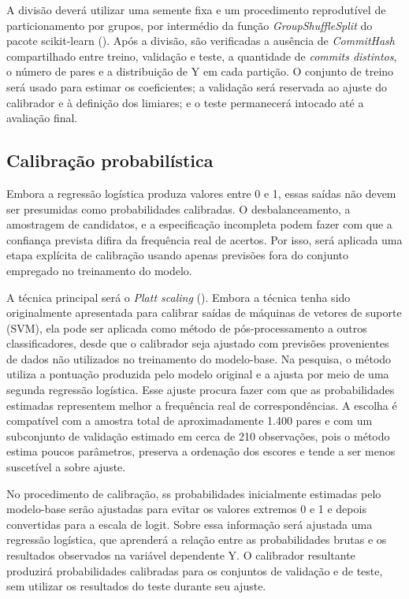 A divisão deverá utilizar uma semente fixa e um procedimento reprodutível de particionamento por grupos, por intermédio da função \textit{GroupShuffleSplit} do pacote scikit-learn (\cite{pedregosa2011scikit}). Após a divisão, são verificadas a ausência de \textit{CommitHash} compartilhado entre treino, validação e teste, a quantidade de \textit{commits distintos}, o número de pares e a distribuição de Y em cada partição. O conjunto de treino será usado para estimar os coeficientes; a validação será reservada ao ajuste do calibrador e à definição dos limiares; e o teste permanecerá intocado até a avaliação final.


\subsection{Calibração probabilística} 

Embora a regressão logística produza valores entre 0 e 1, essas saídas não devem ser presumidas como probabilidades calibradas. O desbalanceamento, a amostragem de candidatos, e a especificação incompleta podem fazer com que a confiança prevista difira da frequência real de acertos. Por isso, será aplicada uma etapa explícita de calibração usando apenas previsões fora do conjunto empregado no treinamento do modelo.

A técnica principal será o \textit{Platt scaling} (\cite{platt1999probabilistic}). Embora a técnica tenha sido originalmente apresentada para calibrar saídas de máquinas de vetores de suporte (SVM), ela pode ser aplicada como método de pós-processamento a outros classificadores, desde que o calibrador seja ajustado com previsões provenientes de dados não utilizados no treinamento do modelo-base. Na pesquisa, o método utiliza a pontuação produzida pelo modelo original e a ajusta por meio de uma segunda regressão logística. Esse ajuste procura fazer com que as probabilidades estimadas representem melhor a frequência real de correspondências. A escolha é compatível com a amostra total de aproximadamente 1.400 pares e com um subconjunto de validação estimado em cerca de 210 observações, pois o método estima poucos parâmetros, preserva a ordenação dos escores e tende a ser menos suscetível a sobre ajuste. 

No procedimento de calibração, ss probabilidades inicialmente estimadas pelo modelo-base serão ajustadas para evitar os valores extremos 0 e 1 e depois convertidas para a escala de logit. Sobre essa informação será ajustada uma regressão logística, que aprenderá a relação entre as probabilidades brutas e os resultados observados na variável dependente Y. O calibrador resultante produzirá probabilidades calibradas para os conjuntos de validação e de teste, sem utilizar os resultados do teste durante seu ajuste.

